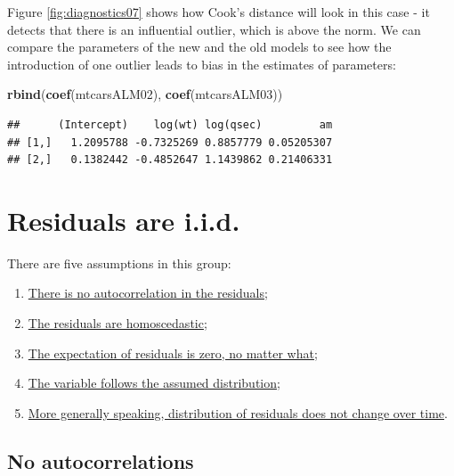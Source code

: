 \documentclass[
]{book}
\newenvironment{Shaded}{\begin{snugshade}}{\end{snugshade}}
\newcommand{\KeywordTok}[1]{\textcolor[rgb]{0.13,0.29,0.53}{\textbf{#1}}}
\newcommand{\NormalTok}[1]{#1}
\providecommand{\tightlist}{%
  \setlength{\itemsep}{0pt}\setlength{\parskip}{0pt}}
\theoremstyle{definition}
\theoremstyle{definition}
\theoremstyle{definition}
\theoremstyle{definition}
\theoremstyle{remark}
\begin{document}
Figure \ref{fig:diagnostics07} shows how Cook's distance will look in this case - it detects that there is an influential outlier, which is above the norm. We can compare the parameters of the new and the old models to see how the introduction of one outlier leads to bias in the estimates of parameters:

\begin{Shaded}
\begin{Highlighting}[]
\KeywordTok{rbind}\NormalTok{(}\KeywordTok{coef}\NormalTok{(mtcarsALM02),}
      \KeywordTok{coef}\NormalTok{(mtcarsALM03))}
\end{Highlighting}
\end{Shaded}

\begin{verbatim}
##      (Intercept)    log(wt) log(qsec)         am
## [1,]   1.2095788 -0.7325269 0.8857779 0.05205307
## [2,]   0.1382442 -0.4852647 1.1439862 0.21406331
\end{verbatim}

\hypertarget{assumptionsResidualsAreIID}{%
\section{Residuals are i.i.d.}\label{assumptionsResidualsAreIID}}

There are five assumptions in this group:

\begin{enumerate}
\def\labelenumi{\arabic{enumi}.}
\tightlist
\item
  \protect\hyperlink{assumptionsResidualsAreIIDAutocorrelations}{There is no autocorrelation in the residuals};
\item
  \protect\hyperlink{assumptionsResidualsAreIIDHomoscedasticity}{The residuals are homoscedastic};
\item
  \protect\hyperlink{assumptionsResidualsAreIIDMean}{The expectation of residuals is zero, no matter what};
\item
  \protect\hyperlink{assumptionsDistribution}{The variable follows the assumed distribution};
\item
  \protect\hyperlink{assumptionsDistributionFixed}{More generally speaking, distribution of residuals does not change over time}.
\end{enumerate}

\hypertarget{assumptionsResidualsAreIIDAutocorrelations}{%
\subsection{No autocorrelations}\label{assumptionsResidualsAreIIDAutocorrelations}}
\end{document}
